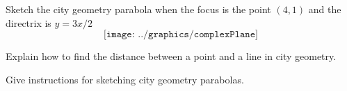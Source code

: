 \break

\begin{prob}
Sketch the city geometry parabola when the focus is the point $(4,1)$
and the directrix is $y=3x/2$
\[
\texttt{[image: ../graphics/complexPlane]}
\]
\end{prob}

\begin{prob}
Explain how to find the distance between a point and a line in city
geometry.
\end{prob}


\begin{prob}
Give instructions for sketching city geometry parabolas.
\end{prob}


